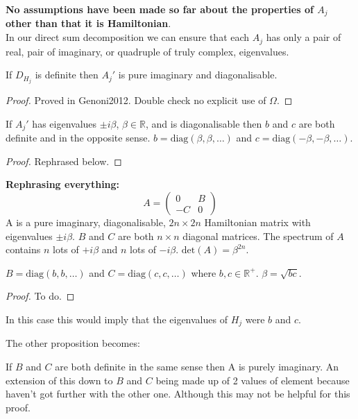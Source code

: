 \textbf{No assumptions have been made so far about the properties of $A_j$ other than that it is Hamiltonian}.\\
In our direct sum decomposition we can ensure that each $A_j$ has only a pair of real, pair of imaginary, or quadruple of truly complex, eigenvalues.

\begin{lemma}
If $D_{H_j}$ is definite then $A_j'$ is pure imaginary and diagonalisable.
\end{lemma}
\begin{proof}
Proved in Genoni2012. Double check no explicit use of $\Omega$.
\end{proof}
\begin{proposition}
If $A_j'$ has eigenvalues $\pm i\beta$, $\beta \in \mathbb{R}$, and is diagonalisable then $b$ and $c$ are both definite and in the opposite sense. $b = \text{diag}(\beta,\beta,\ldots)$ and $c = \text{diag}(-\beta,-\beta,\ldots)$.
\end{proposition}
\begin{proof}
Rephrased below.
\end{proof}

\textbf{Rephrasing everything:}\\
\begin{equation}
A = \begin{pmatrix} 0 & B \\ -C & 0 \end{pmatrix}
\end{equation}
A is a pure imaginary, diagonalisable, $2n \times 2n$ Hamiltonian matrix with eigenvalues $\pm i\beta$. $B$ and $C$ are both $n \times n$ diagonal matrices. The spectrum of $A$ contains $n$ lots of $+i\beta$ and $n$ lots of $-i\beta$. $\text{det}(A) = \beta^{2n}$.
\begin{proposition}
$B = \text{diag}(b, b,\ldots)$ and $C = \text{diag}(c, c, \ldots)$ where $b, c \in \mathbb{R}^+$. $\beta = \sqrt{bc}$. 
\end{proposition}
\begin{proof}
To do.
\end{proof}
In this case this would imply that the eigenvalues of $H_j$ were $b$ and $c$.

The other proposition becomes:
\begin{proposition}
If $B$ and $C$ are both definite in the same sense then A is purely imaginary. An extension of this down to $B$ and $C$ being made up of 2 values of element because haven't got further with the other one. Although this may not be helpful for this proof.
\end{proposition}

